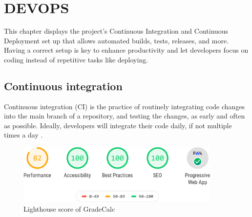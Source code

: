 \chapter{DEVOPS}
\label{chap:devops}

This chapter displays the project's Continuous Integration and Continuous Deployment set up that allows automated builds, tests, releases, and more. Having a correct setup is key to enhance productivity and let developers focus on coding instead of repetitive tasks like deploying.


\section{Continuous integration}
\label{sec:ci}

Continuous integration (CI) is the practice of routinely integrating code changes into the main branch of a repository, and testing the changes, as early and often as possible. Ideally, developers will integrate their code daily, if not multiple times a day \cite{ci-definition}.

\vfill
\begin{figure}[ht!]
    \center
    \includegraphics[width=0.9\textwidth]{media/lighthouse-score.png}
    \caption{Lighthouse score of GradeCalc}
    \label{lighthouse-score}
\end{figure}
\vfill

\clearpage\newpage\noindent

